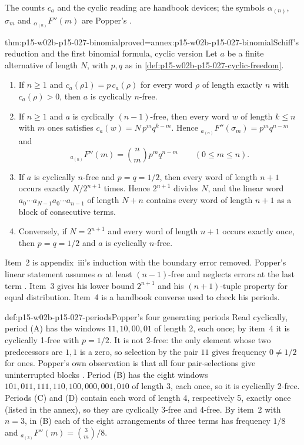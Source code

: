 The counts \(c_a\) and the cyclic reading are handbook devices; the
symbols \(\alpha_{(n)}\), \(\sigma_m\) and \({}_{\alpha_{(n)}}F''(m)\) are
Popper's \parencite[\S56; appendix~iii]{Popper2002LogicDiscoveryUI}.

\begin{hbtheorem}{thm:p15-w02b-p15-027-binomial}{proved=annex:p15-w02b-p15-027-binomial}{Schiff's reduction and the first binomial formula, cyclic version}
Let \(a\) be a finite alternative of length \(N\), with \(p,q\) as in
\cref{def:p15-w02b-p15-027-cyclic-freedom}.
\begin{enumerate}
\item If \(n\geq1\) and \(c_a(\rho1)=p\,c_a(\rho)\) for every word
  \(\rho\) of length exactly \(n\) with \(c_a(\rho)>0\), then \(a\) is
  cyclically \(n\)-free.
\item If \(n\geq1\) and \(a\) is cyclically \((n-1)\)-free, then every
  word \(w\) of length \(k\leq n\) with \(m\) ones satisfies
  \(c_a(w)=N\,p^m q^{k-m}\). Hence
  \({}_{a_{(n)}}F''(\sigma_m)=p^mq^{n-m}\) and
  \[
    {}_{a_{(n)}}F''(m)=\binom{n}{m}p^mq^{n-m}\qquad(0\leq m\leq n).
  \]
\item If \(a\) is cyclically \(n\)-free and \(p=q=1/2\), then every word
  of length \(n+1\) occurs exactly \(N/2^{n+1}\) times. Hence
  \(2^{n+1}\) divides \(N\), and the linear word
  \(a_0\cdots a_{N-1}a_0\cdots a_{n-1}\) of length \(N+n\) contains every
  word of length \(n+1\) as a block of consecutive terms.
\item Conversely, if \(N=2^{n+1}\) and every word of length \(n+1\)
  occurs exactly once, then \(p=q=1/2\) and \(a\) is cyclically \(n\)-free.
\end{enumerate}
\end{hbtheorem}

Item~2 is appendix~iii's induction with the boundary error removed.
Popper's linear statement assumes \(\alpha\) at least \((n-1)\)-free
and neglects errors at the last term
\parencite[appendix~iii]{Popper2002LogicDiscoveryUI}. Item~3 gives his
lower bound \(2^{n+1}\) and his \((n+1)\)-tuple property for equal
distribution. Item~4 is a handbook converse used to check his periods.

\begin{hbexample}{def:p15-w02b-p15-027-periods}{Popper's four generating periods}
Read cyclically, period (A) has the windows \(11,10,00,01\) of length
2, each once; by item~4 it is cyclically 1-free with \(p=1/2\). It is
not 2-free: the only element whose two predecessors are \(1,1\) is a
zero, so selection by the pair \(11\) gives frequency \(0\neq1/2\) for
ones. Popper's own observation is that all four pair-selections give
uninterrupted blocks \parencite[\S55]{Popper2002LogicDiscoveryUI}.
Period (B) has the eight windows
\(101,011,111,110,100,000,001,010\) of length 3, each once, so it is
cyclically 2-free. Periods (C) and (D) contain each word of length 4,
respectively 5, exactly once (listed in the annex), so they are
cyclically 3-free and 4-free. By item~2 with \(n=3\), in (B) each of the
eight arrangements of three terms has frequency \(1/8\) and
\({}_{a_{(3)}}F''(m)=\binom{3}{m}/8\).
\end{hbexample}

